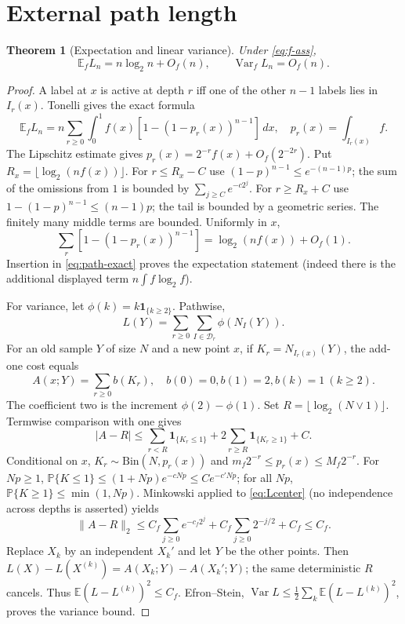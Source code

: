 \documentclass[11pt]{article}
\numberwithin{equation}{section}
\newtheorem{theorem}{Theorem}[section]
\newcommand{\E}{\mathbb E}\newcommand{\Pp}{\mathbb P}
\newcommand{\Var}{\operatorname{Var}}\newcommand{\Cov}{\operatorname{Cov}}
\newcommand{\1}{\mathbf 1}\newcommand{\F}{\mathcal F}\newcommand{\D}{\mathcal D}
\newcommand{\norm}[1]{\lVert#1\rVert}
\begin{document}
\section{External path length}
\begin{theorem}[Expectation and linear variance]\label{thm:path}
Under \eqref{eq:f-ass},
\begin{equation}\label{eq:path-result}
 \E_fL_n=n\log_2n+O_f(n),\qquad \Var_fL_n=O_f(n).
\end{equation}
\end{theorem}
\begin{proof}
A label at $x$ is active at depth $r$ iff one of the other $n-1$ labels lies
in $I_r(x)$.  Tonelli gives the exact formula
\begin{equation}\label{eq:path-exact}
 \E_fL_n=n\sum_{r\ge0}\int_0^1f(x)
 [1-(1-p_r(x))^{n-1}]\,dx,\quad p_r(x)=\int_{I_r(x)}f.
\end{equation}
The Lipschitz estimate gives
$p_r(x)=2^{-r}f(x)+O_f(2^{-2r})$.  Put
$R_x=\lfloor\log_2(nf(x))\rfloor$.  For $r\le R_x-C$ use
$(1-p)^{n-1}\le e^{-(n-1)p}$; the sum of the omissions from $1$ is bounded
by $\sum_{j\ge C}e^{-c2^j}$.  For $r\ge R_x+C$ use
$1-(1-p)^{n-1}\le(n-1)p$; the tail is bounded by a geometric series.
The finitely many middle terms are bounded.  Uniformly in $x$,
\[
 \sum_r[1-(1-p_r(x))^{n-1}]=\log_2(nf(x))+O_f(1).
\]
Insertion in \eqref{eq:path-exact} proves the expectation statement (indeed
there is the additional displayed term $n\int f\log_2 f$).

For variance, let $\phi(k)=k\1_{\{k\ge2\}}$.  Pathwise,
\begin{equation}\label{eq:Loccup}
L(Y)=\sum_{r\ge0}\sum_{I\in\D_r}\phi(N_I(Y)).
\end{equation}
For an old sample $Y$ of size $N$ and a new point $x$, if
$K_r=N_{I_r(x)}(Y)$, the add-one cost equals
\begin{equation}\label{eq:addL}
 A(x;Y)=\sum_{r\ge0}b(K_r),\quad b(0)=0, b(1)=2, b(k)=1\ (k\ge2).
\end{equation}
The coefficient two is the increment $\phi(2)-\phi(1)$.  Set
$R=\lfloor\log_2(N\vee1)\rfloor$.  Termwise comparison with one gives
\begin{equation}\label{eq:Lcenter}
 |A-R|\le\sum_{r<R}\1_{\{K_r\le1\}}+2\sum_{r\ge R}\1_{\{K_r\ge1\}}+C.
\end{equation}
Conditional on $x$, $K_r\sim\mathrm{Bin}(N,p_r(x))$ and
$m_f2^{-r}\le p_r(x)\le M_f2^{-r}$.  For $Np\ge1$,
$\Pp\{K\le1\}\le(1+Np)e^{-cNp}\le C e^{-c' Np}$; for all $Np$,
$\Pp\{K\ge1\}\le\min(1,Np)$.  Minkowski applied to
\eqref{eq:Lcenter} (no independence across depths is asserted) yields
\[
 \norm{A-R}_2\le C_f\sum_{j\ge0}e^{-c_f2^j}
 +C_f\sum_{j\ge0}2^{-j/2}+C_f\le C_f.
\]
Replace $X_k$ by an independent $X_k'$ and let $Y$ be the other points.
Then
$L(X)-L(X^{(k)})=A(X_k;Y)-A(X_k';Y)$; the same deterministic $R$ cancels.
Thus $\E(L-L^{(k)})^2\le C_f$.  Efron--Stein,
$\Var L\le\frac12\sum_k\E(L-L^{(k)})^2$, proves the variance bound.
\end{proof}
\end{document}
